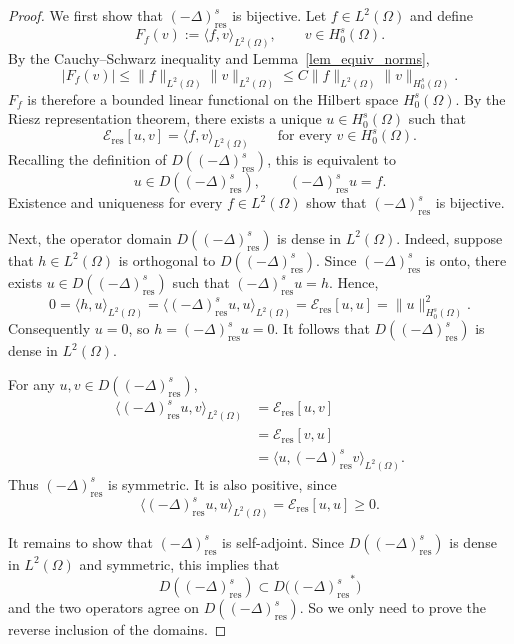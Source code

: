 \documentclass[10pt,a4paper]{amsart}
\begin{document}
\begin{proof} We first show that $(-\Delta)^s_{\mathrm{res}}$ is bijective. Let
$f\in L^2(\Omega)$ and define
\[
    F_f(v):=\langle f,v\rangle_{L^2(\Omega)},
    \qquad v\in H^s_0(\Omega).
\]
By the Cauchy--Schwarz inequality and
Lemma~\ref{lem_equiv_norms},
\[
    |F_f(v)|
    \leq
    \|f\|_{L^2(\Omega)}
    \|v\|_{L^2(\Omega)}
    \leq
    C\|f\|_{L^2(\Omega)}
    \|v\|_{H^s_0(\Omega)}.
\]
$F_f$ is therefore a bounded linear functional on the Hilbert space
$H^s_0(\Omega)$. By the Riesz representation theorem, there exists a
unique $u\in H^s_0(\Omega)$ such that
\[
    \mathcal E_{\mathrm{res}}[u,v]
    =
    \langle f,v\rangle_{L^2(\Omega)}
    \qquad
    \text{for every }v\in H^s_0(\Omega).
\]
Recalling the definition of $D((-\Delta)^s_{\mathrm{res}})$, this is equivalent to
\[
    u\in D((-\Delta)^s_{\mathrm{res}}),
    \qquad
    (-\Delta)^s_{\mathrm{res}}u=f.
\]
Existence and uniqueness for every $f\in L^2(\Omega)$ show
that $(-\Delta)^s_{\mathrm{res}}$ is bijective.

Next, the operator domain $D((-\Delta)^s_{\mathrm{res}})$ is dense in $L^2(\Omega)$. Indeed,
suppose that $h\in L^2(\Omega)$ is orthogonal to $D((-\Delta)^s_{\mathrm{res}})$.
Since $(-\Delta)^s_{\mathrm{res}}$ is onto, there exists
$u\in D((-\Delta)^s_{\mathrm{res}})$ such that
$(-\Delta)^s_{\mathrm{res}}u=h$. Hence,
\[
    0
    =
    \langle h,u\rangle_{L^2(\Omega)}
    =
    \langle (-\Delta)^s_{\mathrm{res}}u,u\rangle_{L^2(\Omega)}
    =
    \mathcal E_{\mathrm{res}}[u,u]
    =
    \|u\|_{H^s_0(\Omega)}^2.
\]
Consequently $u=0$, so
$h=(-\Delta)^s_{\mathrm{res}}u=0$. It follows that
$D((-\Delta)^s_{\mathrm{res}})$ is dense in $L^2(\Omega)$.

For any $u,v\in D((-\Delta)^s_{\mathrm{res}})$,
\begin{align*}
    \langle (-\Delta)^s_{\mathrm{res}}u,v\rangle_{L^2(\Omega)}
    &=
    \mathcal E_{\mathrm{res}}[u,v] \\
    &=
    \mathcal E_{\mathrm{res}}[v,u] \\
    &=
    \langle u,(-\Delta)^s_{\mathrm{res}}v\rangle_{L^2(\Omega)}.
\end{align*}
Thus $(-\Delta)^s_{\mathrm{res}}$ is symmetric. It is also positive,
since
\[
    \langle (-\Delta)^s_{\mathrm{res}}u,u\rangle_{L^2(\Omega)}
    =
    \mathcal E_{\mathrm{res}}[u,u]
    \geq 0.
\]

It remains to show that $(-\Delta)^s_{\mathrm{res}}$ is self-adjoint.
Since $D((-\Delta)^s_{\mathrm{res}})$ is dense in $L^2(\Omega)$ and symmetric, this implies that  
\[
    D((-\Delta)^s_{\mathrm{res}})
    \subset
    D\bigl({(-\Delta)^s_{\mathrm{res}}}^*\bigr)
\]
and the two operators agree on $D((-\Delta)^s_{\mathrm{res}})$. So we only need to prove the reverse inclusion of the
domains.


\end{proof}
\end{document}
